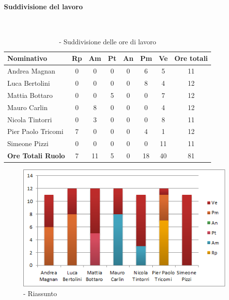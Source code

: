 \documentclass[../PianoDiProgetto.tex]{subfiles}
\begin{document}
\vspace{35mm}	
	
	
	\subsubsection{\PerV}
				\paragraph{Suddivisione del lavoro}\
					
	\begin{table}[H]
		\begin{tabularx}{\textwidth}{l  * {6}{c}  c}
			\toprule
			\textbf{Nominativo} & \textbf{Rp} & \textbf{Am} & \textbf{Pt} 
						& \textbf{An} & \textbf{Pm} & \textbf{Ve} & \textbf{Ore totali} \\
			\midrule
			Andrea Magnan  & 0 & 0 & 0 & 0 & 6 & 5 & 11 \\
			Luca Bertolini  & 0 & 0 & 0 & 0 & 8 & 4 & 12 \\
			Mattia Bottaro  & 0 & 0 & 5 & 0 & 0 & 7 & 12 \\
			Mauro Carlin  & 0 & 8 & 0 & 0 & 0 & 4 & 12 \\
			Nicola Tintorri  & 0 & 3 & 0 & 0 & 0 & 8 & 11 \\
			Pier Paolo Tricomi  & 7 & 0 & 0 & 0 & 4 & 1 & 12 \\
			Simeone Pizzi & 0 & 0 & 0 & 0 & 0 & 11 & 11 \\
			\midrule
			\textbf{Ore Totali Ruolo} & 7 & 11 & 5 & 0 & 18 & 40 & 81 \\
			\bottomrule
		\end{tabularx}
		\caption{\PerV{} - Suddivisione delle ore di lavoro}
	\end{table}
\vfill	

	
	\begin{figure}[H]
		\centering
		\includegraphics[width=11cm, trim=1cm 0cm 1cm 0cm]{grafici/V-persona}
			\caption{\PerV{} - Riassunto}
	\end{figure}
	
\end{document}
